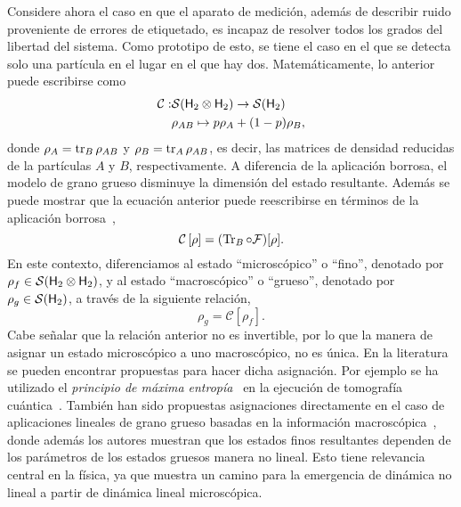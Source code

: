 \documentclass[10pt]{article}
\newcommand{\mcS}{\mathcal{S}}
\newcommand{\hilbert}{{\sf H}}
\newcommand{\mcF}{\mathcal{F}}
\newcommand{\mcC}{\mathcal{C}}
\newcommand{\CG}[1]{\mcC\left[#1\right]}
\begin{document}
Considere ahora el caso en que el aparato de medición, además de describir ruido proveniente de errores de etiquetado, es incapaz de resolver todos los grados del libertad del sistema. Como prototipo de esto, se tiene el caso en el que se detecta solo una partícula en el lugar en el que hay dos. Matemáticamente, lo anterior puede escribirse como
\begin{align*}
\mcC:&\mcS(\hilbert_2 \otimes \hilbert_2)\to \mcS(\hilbert_2)\nonumber\\
 &\rho_{AB} \mapsto p\rho_A+(1-p)\rho_B,
\end{align*}
donde $\rho_A=\tr_B \rho_{AB}$ y $\rho_B=\tr_A \rho_{AB}$, es decir, las matrices de densidad reducidas de la partículas $A$ y $B$, respectivamente.
%
%
A diferencia de la aplicación borrosa, el modelo de grano grueso disminuye la dimensión del estado resultante. Además se puede mostrar que la ecuación anterior puede reescribirse en términos de la aplicación borrosa~\cite{FuzzyMeasurements},
\begin{equation*}
\CG{\rho}=(\Tr_{B}\circ\mcF)[\rho].
\end{equation*}
En este contexto, diferenciamos al estado ``microscópico'' o ``fino'', denotado por $\rho_{f}\in \mcS(\hilbert_2\otimes\hilbert_2)$, y al estado ``macroscópico'' o ``grueso'', denotado por $\rho_{g}\in \mcS(\hilbert_2)$, a través de la siguiente relación,
\begin{equation*}
    \rho_{g}=\CG{\rho_{f}}.
\end{equation*}
Cabe señalar que la relación anterior no es invertible, por lo que la manera de asignar un estado microscópico a uno macroscópico, no es única. En la literatura se pueden encontrar propuestas para hacer dicha asignación. Por ejemplo se ha utilizado el \textit{principio de máxima entropía}~\cite{jaynes} en la ejecución de tomografía cuántica~\cite{maxent}. También han sido propuestas asignaciones directamente en el caso de aplicaciones lineales de grano grueso basadas en la información macroscópica~\cite{Macro-To-Micro}, donde además los autores muestran que los estados finos resultantes dependen de los parámetros de los estados gruesos manera no lineal. Esto tiene relevancia central en la física, ya que muestra un camino para la emergencia de dinámica no lineal a partir de dinámica lineal microscópica.
\end{document}

